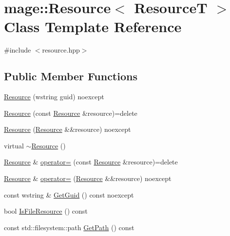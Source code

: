 \hypertarget{classmage_1_1_resource}{}\section{mage\+:\+:Resource$<$ ResourceT $>$ Class Template Reference}
\label{classmage_1_1_resource}


{\ttfamily \#include $<$resource.\+hpp$>$}

\subsection*{Public Member Functions}
\begin{DoxyCompactItemize}
\item 
\mbox{\hyperlink{classmage_1_1_resource_a397a81a1195dea231776db9787cad52d}{Resource}} (wstring guid) noexcept
\item 
\mbox{\hyperlink{classmage_1_1_resource_a53da586d9bae285ab50c4cca2421a9ce}{Resource}} (const \mbox{\hyperlink{classmage_1_1_resource}{Resource}} \&resource)=delete
\item 
\mbox{\hyperlink{classmage_1_1_resource_adfff024cb267644156ba1b357d6f8d10}{Resource}} (\mbox{\hyperlink{classmage_1_1_resource}{Resource}} \&\&resource) noexcept
\item 
virtual \mbox{\hyperlink{classmage_1_1_resource_a56a3ac799224e100b271b65ec455b59e}{$\sim$\+Resource}} ()
\item 
\mbox{\hyperlink{classmage_1_1_resource}{Resource}} \& \mbox{\hyperlink{classmage_1_1_resource_a938159cb02ec565b9b957f993db4769d}{operator=}} (const \mbox{\hyperlink{classmage_1_1_resource}{Resource}} \&resource)=delete
\item 
\mbox{\hyperlink{classmage_1_1_resource}{Resource}} \& \mbox{\hyperlink{classmage_1_1_resource_aa1f7a7ddd31f4fc16293b4a5ca9a93c8}{operator=}} (\mbox{\hyperlink{classmage_1_1_resource}{Resource}} \&\&resource) noexcept
\item 
const wstring \& \mbox{\hyperlink{classmage_1_1_resource_adaa2464cb1fdb51a3f6028c0f316d083}{Get\+Guid}} () const noexcept
\item 
bool \mbox{\hyperlink{classmage_1_1_resource_ae783140e30a974c8820e5ae8be9e4b44}{Is\+File\+Resource}} () const
\item 
const std\+::filesystem\+::path \mbox{\hyperlink{classmage_1_1_resource_a7611d0317a247d324d432b26aab6aee2}{Get\+Path}} () const
\end{DoxyCompactItemize}
